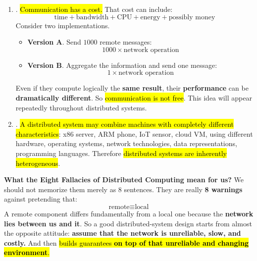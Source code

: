 \begin{enumerate}
    \item {}. \hl{Communication has a cost.} That cost can include:
        \begin{equation*}
            \text{time} + \text{bandwidth} + \text{CPU} + \text{energy} + \text{possibly money}
        \end{equation*}
        Consider two implementations.
        \begin{itemize}
            \item \textbf{Version A}. Send $1000$ remote messages:
                \begin{equation*}
                    1000 \times \text{network operation}
                \end{equation*}
            \item \textbf{Version B}. Aggregate the information and send one message:
                \begin{equation*}
                    1 \times \text{network operation}
                \end{equation*}
        \end{itemize}
        Even if they compute logically the \textbf{same result}, their \textbf{performance} can be \textbf{dramatically different}. So \hl{communication is not free}. This idea will appear repeatedly throughout distributed systems.

    \item {}. \hl{A distributed system may combine machines with completely different characteristics}: x86 server, ARM phone, IoT sensor, cloud VM, using different hardware, operating systems, network technologies, data representations, programming languages. Therefore \hl{distributed systems are inherently heterogeneous}.
\end{enumerate}
\textcolor{Green3}{ \textbf{What the Eight Fallacies of Distributed Computing mean for us?}} We should not memorize them merely as 8 sentences. They are really \textbf{8 warnings} against pretending that:
\begin{equation*}
    \text{remote} \equiv \text{local}
\end{equation*}
A remote component differs fundamentally from a local one because the \textbf{network lies between us and it}. So a good distributed-system design starts from almost the opposite attitude: \textbf{assume that the network is unreliable, slow, and costly.} And then \hl{builds guarantees \textbf{on top of that unreliable and changing environment}.}

